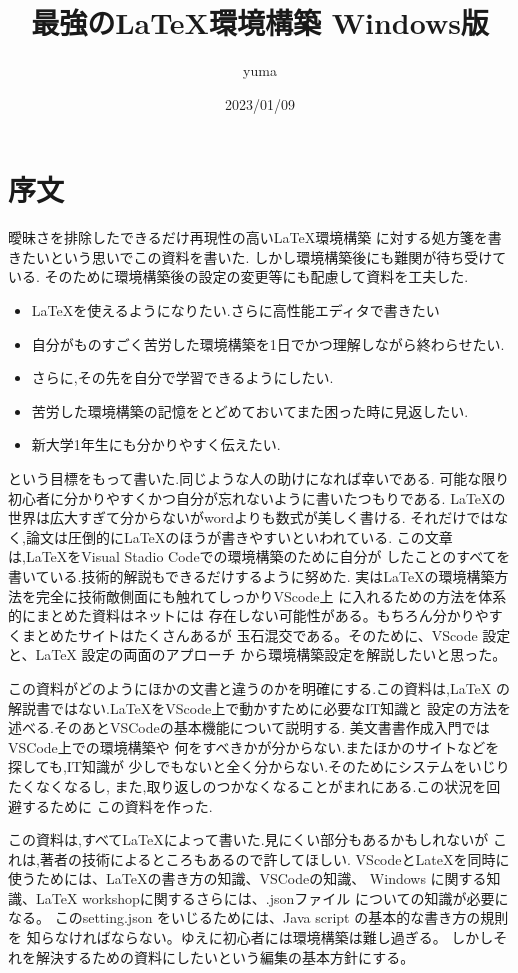 \documentclass{ltjsarticle}
\begin{document}
\title{最強の\LaTeX 環境構築 Windows版}
\author{yuma}
\date{2023/01/09}
\maketitle
\section{序文}
曖昧さを排除したできるだけ再現性の高い\LaTeX 環境構築
に対する処方箋を書きたいという思いでこの資料を書いた.
しかし環境構築後にも難関が待ち受けている.
そのために環境構築後の設定の変更等にも配慮して資料を工夫した.
\begin{itemize}
  \item \LaTeX を使えるようになりたい.さらに高性能エディタで書きたい
  \item 自分がものすごく苦労した環境構築を1日でかつ理解しながら終わらせたい.
  \item さらに,その先を自分で学習できるようにしたい.
  \item 苦労した環境構築の記憶をとどめておいてまた困った時に見返したい.
  \item 新大学1年生にも分かりやすく伝えたい.
\end{itemize}
という目標をもって書いた.同じような人の助けになれば幸いである.
可能な限り初心者に分かりやすくかつ自分が忘れないように書いたつもりである.
\LaTeX の世界は広大すぎて分からないがwordよりも数式が美しく書ける.
それだけではなく,論文は圧倒的に\LaTeX のほうが書きやすいといわれている.
この文章は,\LaTeX をVisual Stadio Codeでの環境構築のために自分が
したことのすべてを書いている.技術的解説もできるだけするように努めた.
実は\LaTeX の環境構築方法を完全に技術敵側面にも触れてしっかりVScode上
に入れるための方法を体系的にまとめた資料はネットには
存在しない可能性がある。もちろん分かりやすくまとめたサイトはたくさんあるが
玉石混交である。そのために、VScode 設定と、LaTeX 設定の両面のアプローチ
から環境構築設定を解説したいと思った。


この資料がどのようにほかの文書と違うのかを明確にする.この資料は,\LaTeX
の解説書ではない.\LaTeX をVScode上で動かすために必要なIT知識と
設定の方法を述べる.そのあとVSCodeの基本機能について説明する.
美文書書作成入門\cite{美文書本}ではVSCode上での環境構築や
何をすべきかが分からない.またほかのサイトなどを探しても,IT知識が
少しでもないと全く分からない.そのためにシステムをいじりたくなくなるし,
また,取り返しのつかなくなることがまれにある.この状況を回避するために
この資料を作った.


この資料は,すべて\LaTeX によって書いた.見にくい部分もあるかもしれないが
これは,著者の技術によるところもあるので許してほしい.
VScodeとLateXを同時に使うためには、LaTeXの書き方の知識、VSCodeの知識、
Windows に関する知識、LaTeX workshopに関するさらには、.jsonファイル
についての知識が必要になる。
このsetting.json をいじるためには、Java script の基本的な書き方の規則を
知らなければならない。ゆえに初心者には環境構築は難し過ぎる。
しかしそれを解決するための資料にしたいという編集の基本方針にする。
\end{document}
